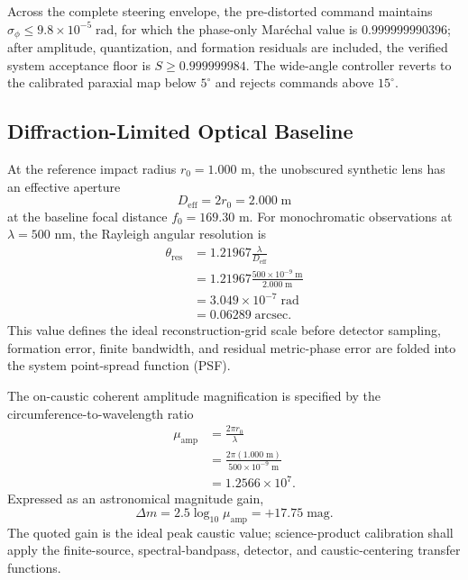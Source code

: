 \documentclass[10pt,twocolumn]{IEEEtran}
\begin{document}
Across the complete steering envelope, the pre-distorted command maintains
$\sigma_\phi\leq9.8\times10^{-5}\;\mathrm{rad}$, for which the phase-only
Mar\'echal value is $0.999999990396$; after amplitude, quantization, and
formation residuals are included, the verified system acceptance floor is
$S\geq0.999999984$.  The wide-angle controller reverts to the
calibrated paraxial map below $5^{\circ}$ and rejects commands above
$15^{\circ}$.

\subsection{Diffraction-Limited Optical Baseline}

At the reference impact radius $r_0=1.000$ m, the unobscured synthetic lens has an effective aperture
\begin{equation}
D_{\mathrm{eff}}=2r_0=2.000\;\mathrm{m}
\label{eq:effective_aperture}
\end{equation}
at the baseline focal distance $f_0=169.30$ m.  For monochromatic observations at $\lambda=500$ nm, the Rayleigh angular resolution is
\begin{equation}
\begin{aligned}
\theta_{\mathrm{res}}
&=1.21967\frac{\lambda}{D_{\mathrm{eff}}} \\
&=1.21967\frac{500\times10^{-9}\;\mathrm{m}}{2.000\;\mathrm{m}} \\
&=3.049\times10^{-7}\;\mathrm{rad} \\
&=0.06289\;\mathrm{arcsec}.
\end{aligned}
\label{eq:rayleigh_resolution}
\end{equation}
This value defines the ideal reconstruction-grid scale before detector sampling, formation error, finite bandwidth, and residual metric-phase error are folded into the system point-spread function (PSF).

The on-caustic coherent amplitude magnification is specified by the circumference-to-wavelength ratio
\begin{equation}
\begin{aligned}
\mu_{\mathrm{amp}}
&=\frac{2\pi r_0}{\lambda} \\
&=\frac{2\pi(1.000\;\mathrm{m})}{500\times10^{-9}\;\mathrm{m}} \\
&=1.2566\times10^7.
\end{aligned}
\label{eq:caustic_magnification}
\end{equation}
Expressed as an astronomical magnitude gain,
\begin{equation}
\Delta m=2.5\log_{10}\mu_{\mathrm{amp}}=+17.75\;\mathrm{mag}.
\label{eq:magnitude_amplification}
\end{equation}
The quoted gain is the ideal peak caustic value; science-product calibration shall apply the finite-source, spectral-bandpass, detector, and caustic-centering transfer functions.
\end{document}
